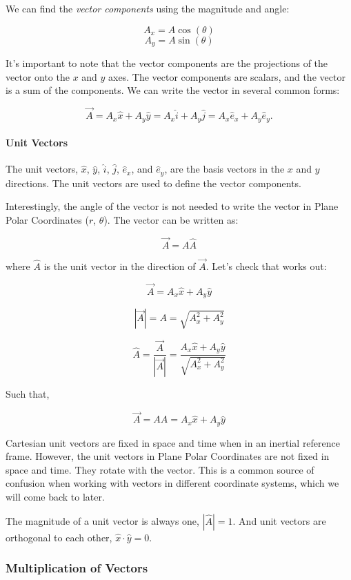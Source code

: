 \documentclass[11pt]{article}
\begin{document}
We can find the \emph{vector components} using the magnitude and angle:

\[A_x = A\cos(\theta)\] \[A_y = A\sin(\theta)\]

It's important to note that the vector components are the projections of
the vector onto the \(x\) and \(y\) axes. The vector components are
scalars, and the vector is a sum of the components. We can write the
vector in several common forms:

\[\vec{A} = A_x\hat{x} + A_y\hat{y}  = A_x\hat{i} + A_y\hat{j} = A_x\hat{e}_x + A_y\hat{e}_y.\]

\paragraph{Unit Vectors}\label{unit-vectors}

The unit vectors, \(\hat{x}\), \(\hat{y}\), \(\hat{i}\), \(\hat{j}\),
\(\hat{e}_x\), and \(\hat{e}_y\), are the basis vectors in the \(x\) and
\(y\) directions. The unit vectors are used to define the vector
components.

Interestingly, the angle of the vector is not needed to write the vector
in Plane Polar Coordinates (\(r\), \(\theta\)). The vector can be
written as:

\[\vec{A} = A\hat{A}\]

where \(\hat{A}\) is the unit vector in the direction of \(\vec{A}\).
Let's check that works out:

\[\vec{A} = A_x\hat{x} + A_y\hat{y}\]

\[|\vec{A}| = A = \sqrt{A_x^2 + A_y^2}\]

\[\hat{A} = \dfrac{\vec{A}}{|\vec{A}|} = \dfrac{A_x\hat{x} + A_y\hat{y}}{\sqrt{A_x^2 + A_y^2}}\]

Such that,

\[\vec{A} = A\hat{A} = A_x\hat{x} + A_y\hat{y}\]

Cartesian unit vectors are fixed in space and time when in an inertial
reference frame. However, the unit vectors in Plane Polar Coordinates
are not fixed in space and time. They rotate with the vector. This is a
common source of confusion when working with vectors in different
coordinate systems, which we will come back to later.

The magnitude of a unit vector is always one, \(|\hat{A}| = 1\). And
unit vectors are orthogonal to each other,
\(\hat{x} \cdot \hat{y} = 0\).

    \subsubsection{Multiplication of
Vectors}\label{multiplication-of-vectors}
\end{document}

